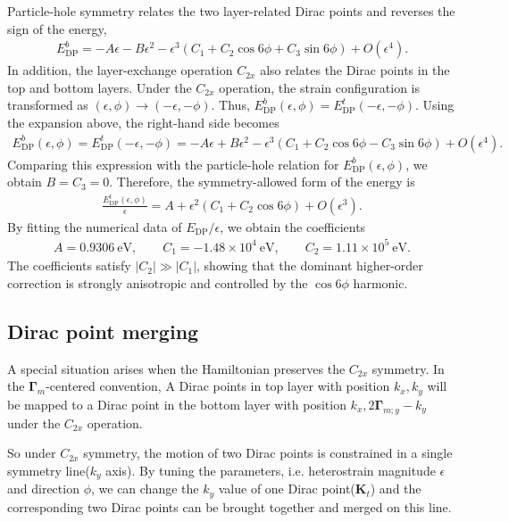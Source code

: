\documentclass[10pt, oneside]{article}
\newcommand{\mr}[1]{\mathrm{#1}}
\newcommand{\p}[1]{\left(#1\right)}
\begin{document}
Particle-hole symmetry relates the two layer-related Dirac points and reverses the sign of the energy, 
\begin{align}
	E^{b}_{\mr{DP}}  = - A \epsilon - B \epsilon^2 - \epsilon^3 \p{C_{1} + C_{2} \cos{6 \phi} + C_{3} \sin{6 \phi}} + O\p{\epsilon^{4}}.
\end{align}
In addition, the layer-exchange operation \(C_{2x}\) also relates the Dirac points in the top and bottom layers. Under the \(C_{2x}\) operation, the strain configuration is transformed as \((\epsilon,\phi)\rightarrow(-\epsilon,-\phi)\). Thus, \(E_{\mr{DP}}^{b}(\epsilon,\phi) = E_{\mr{DP}}^{t}(-\epsilon,-\phi)\). Using the expansion above, the right-hand side becomes
\begin{align}
	E_{\mr{DP}}^{b}(\epsilon,\phi) = E_{\mr{DP}}^{t}(-\epsilon,-\phi) = -A\epsilon + B\epsilon^2 - \epsilon^3 \p{ C_1 + C_2\cos 6\phi - C_3\sin 6\phi} + O(\epsilon^4).
\end{align}
Comparing this expression with the particle-hole relation for \(E_{\mr{DP}}^{b}(\epsilon,\phi)\), we obtain \(B=C_3=0\). Therefore, the symmetry-allowed form of the energy is
\begin{align}
		\frac{E_{\mr{DP}}^{t}(\epsilon,\phi)}{\epsilon} = A + \epsilon^2 \p{ C_1 + C_2\cos 6\phi } + O(\epsilon^3).
\end{align}
By fitting the numerical data of \(E_{\mr{DP}}/\epsilon\), we obtain the coefficients 
\begin{align}
	A = 0.9306~\mathrm{eV}, \qquad
	C_1 = -1.48\times10^{4}~\mathrm{eV}, \qquad
	C_2 = 1.11\times10^{5}~\mathrm{eV}.
\end{align}
The coefficients satisfy \(|C_2| \gg |C_1|\), showing that the dominant higher-order correction is strongly anisotropic and controlled by the \(\cos6\phi\) harmonic.


\subsection{Dirac point merging}
A special situation arises when the Hamiltonian preserves the \(C_{2x}\) symmetry. In the \(\bm{\Gamma}_m\)-centered convention, A Dirac points in top layer with position \(k_x, k_y\) will be mapped to a Dirac point in the bottom layer with position \(k_x, 2 \bm{\Gamma}_{m;y} - k_y\) under the \(C_{2x}\) operation. 

So under \(C_{2x}\) symmetry, the motion of two Dirac points is constrained in a single symmetry line(\(k_y\) axis). By tuning the parameters, i.e. heterostrain magnitude \(\epsilon\) and direction \(\phi\), we can change the \(k_y\) value of one Dirac point(\(\bm{K}_{t}\)) and the corresponding two Dirac points can be brought together and merged on this line.
\end{document}

